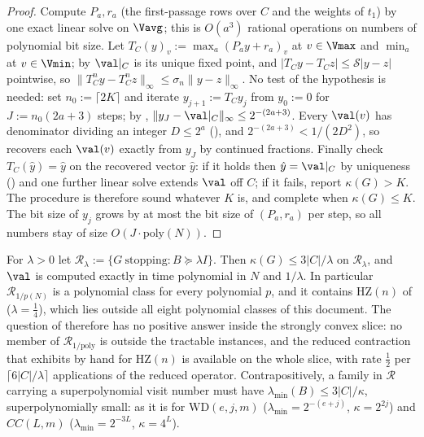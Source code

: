 \begin{proof}
Compute $P_a,r_a$ (the first-passage rows over $C$ and the weights of $t_1$)
by one exact linear solve on $\Vavg$; this is $O(a^3)$ rational operations on
numbers of polynomial bit size. Let $T_C(y)_v:=\max_a(P_ay+r_a)_v$ at
$v\in\Vmax$ and $\min_a$ at $v\in\Vmin$; by 
$\val|_C$ is its unique fixed point, and
$|T_Cy-T_Cz|\le\mathcal S|y-z|$ pointwise, so
$\|T_C^ny-T_C^nz\|_\infty\le\sigma_n\|y-z\|_\infty$.
No test of the hypothesis is needed: set $n_0:=\lceil2K\rceil$ and iterate
$y_{j+1}:=T_Cy_j$ from $y_0:=0$ for $J:=n_0(2a+3)$ steps; by
, $\|y_J-\val|_C\|_\infty\le2^{-(2a+3)}$. Every $\val(v)$
has denominator dividing an integer $D\le2^{a}$
(), and $2^{-(2a+3)}<1/(2D^2)$, so
 recovers each $\val(v)$ exactly from $y_J$ by
continued fractions. Finally check $T_C(\hat y)=\hat y$ on the recovered
vector $\hat y$: if it holds then $\hat y=\val|_C$ by uniqueness
() and one further linear solve extends $\val$
off $C$; if it fails, report $\kappa(G)>K$. The procedure is therefore sound
whatever $K$ is, and complete when $\kappa(G)\le K$. The bit size of $y_j$
grows by at most the bit size of $(P_a,r_a)$ per step, so all numbers stay of
size $O(J\cdot\mathrm{poly}(N))$.
\end{proof}

\begin{corollary}\label{ht:cor-rlambda}
For $\lambda>0$ let $\mathcal R_\lambda:=\{G\ \text{stopping}: B\succeq\lambda I\}$.
Then $\kappa(G)\le3|C|/\lambda$ on $\mathcal R_\lambda$, and $\val$ is computed
exactly in time polynomial in $N$ and $1/\lambda$. In particular
$\mathcal R_{1/p(N)}$ is a polynomial class for every polynomial $p$, and it
contains $\mathrm{HZ}(n)$ of  ($\lambda=\tfrac14$), which lies
outside all eight polynomial classes of this document. The question of
 therefore has no positive answer inside the strongly
convex slice: no member of $\mathcal R_{1/\mathrm{poly}}$ is outside the
tractable instances, and the reduced contraction that  exhibits
by hand for $\mathrm{HZ}(n)$ is available on the whole slice, with rate
$\tfrac12$ per $\lceil6|C|/\lambda\rceil$ applications of the reduced operator.
Contrapositively, a family in $\mathcal R$ carrying a superpolynomial visit
number must have $\lambda_{\min}(B)\le3|C|/\kappa$, superpolynomially small:
as it is for $\mathrm{WD}(e,j,m)$ ($\lambda_{\min}=2^{-(e+j)}$, $\kappa=2^{2j}$)
and $CC(L,m)$ ($\lambda_{\min}=2^{-3L}$, $\kappa=4^{L}$).
\end{corollary}

